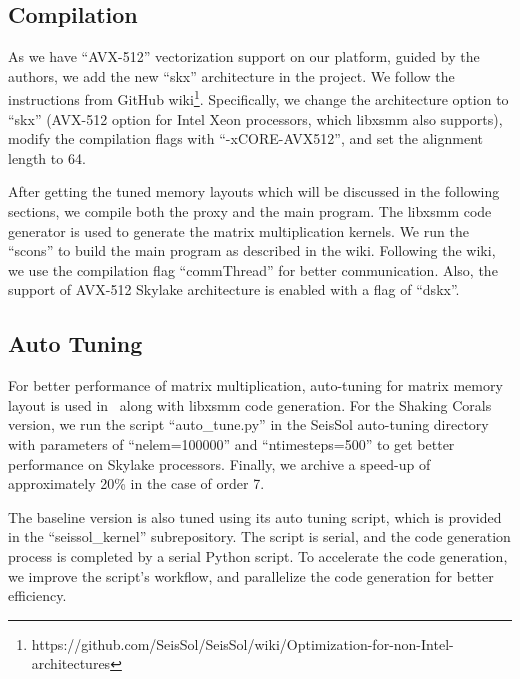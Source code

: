 \documentclass[5p,times]{sig-alternate-05-2015}
\begin{document}

\subsection{Compilation}

As we have ``AVX-512'' vectorization support on our platform, guided by the authors, we add the new ``skx'' architecture in the project. We follow the instructions from GitHub wiki\footnote{https://github.com/SeisSol/SeisSol/wiki/Optimization-for-non-Intel-architectures}. Specifically, we change the architecture option to ``skx'' (AVX-512 option for Intel Xeon processors, which libxsmm also supports), modify the compilation flags with ``-xCORE-AVX512'', and set the alignment length to 64.

After getting the tuned memory layouts which will be discussed in the following sections, we compile both the proxy and the main program. The libxsmm code generator is used to generate the matrix multiplication kernels. We run the ``scons'' to build the main program as described in the wiki. Following the wiki, we use the compilation flag ``commThread'' for better communication. Also, the support of AVX-512 Skylake architecture is enabled with a flag of ``dskx''.

\subsection{Auto Tuning}
For better performance of matrix multiplication, auto-tuning for matrix memory layout is used in \OriginalPaper\ along with libxsmm code generation. For the Shaking Corals version, we run the script ``auto\_tune.py'' in the SeisSol auto-tuning directory with parameters of ``nelem=100000'' and  ``ntimesteps=500'' to get better performance on Skylake processors. Finally, we archive a speed-up of approximately 20\% in the case of order 7. 

The baseline version is also tuned using its auto tuning script, which is provided in the ``seissol\_kernel'' subrepository. The script is serial, and the code generation process is completed by a serial Python script. To accelerate the code generation, we improve the script's workflow, and parallelize the code generation for better efficiency.
\end{document}
